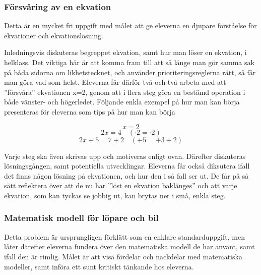 \subsubsection{Försvåring av en ekvation}
    \label{sec:ekvation}

    \textcolor{lila}{Detta är en mycket fri uppgift med målet att ge eleverna en djupare förståelse för ekvationer och ekvationslösning.}

    \textcolor{lila}{Inledningsvis diskuteras begreppet ekvation, samt hur man löser en ekvation, i helklass. Det viktiga här är att komma fram till att så länge man gör samma sak på båda sidorna om likhetstecknet, och använder prioriteringsreglerna rätt, så får man göra vad som helst. Eleverna får därför två och två arbeta med att ''försvåra'' ekvationen x=2, genom att i flera steg göra en bestämd operation i både vänster- och högerledet. Följande enkla exempel på hur man kan börja presenteras för eleverna som tips på hur man kan börja}
    
        \begin{equation*}
            x=2
        \end{equation*}
        \begin{equation*}
            2x=4 \quad (\cdot2=\cdot2)
        \end{equation*}
        \begin{equation*}
            2x+5=7+2 \quad (+5=+3+2)
        \end{equation*}
    
    \noindent\textcolor{lila}{Varje steg ska även skrivas upp och motiveras enligt ovan. Därefter diskuteras lösningsgången, samt potentiella utvecklingar. Eleverna får också diksutera ifall det finns någon lösning på ekvationen, och hur den i så fall ser ut. De får på så sätt reflektera över att de nu har ''löst en ekvation baklänges'' och att varje ekvation, som kan tyckas se jobbig ut, kan brytas ner i små, enkla steg.}

\subsubsection{Matematisk modell för löpare och bil}
    \label{sec:lopare}
    
    \textcolor{lila}{Detta problem är ursprungligen förklätt som en enklare standarduppgift, men låter därefter eleverna fundera över den matematiska modell de har använt, samt ifall den är rimlig. Målet är att visa fördelar och nackdelar med matematiska modeller, samt införa ett sunt kritiskt tänkande hos eleverna.}
    
